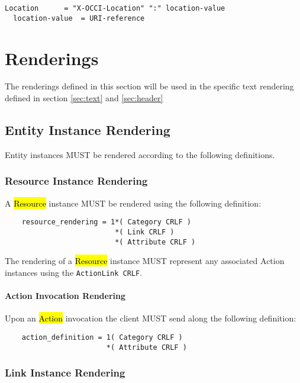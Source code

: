 \documentclass[10pt,a4paper]{article}
\begin{document}
\begin{verbatim}
Location      = "X-OCCI-Location" ":" location-value
  location-value  = URI-reference
\end{verbatim}

\section{Renderings}
\label{sec:renderings}

The renderings defined in this section will be used in the specific text rendering defined in section \ref{sec:text} and \ref{sec:header}

\subsection{Entity Instance Rendering}

Entity instances MUST be rendered according to the following definitions.

\subsubsection{Resource Instance Rendering}

A \hl{Resource} instance MUST be rendered using the following definition:

\begin{verbatim}
	resource_rendering = 1*( Category CRLF )
    	                  *( Link CRLF )
        	              *( Attribute CRLF )
\end{verbatim}

The rendering of a \hl{Resource} instance MUST represent any associated Action instances using the {\tt ActionLink CRLF}.

\paragraph{Action Invocation Rendering}

Upon an \hl{Action} invocation the client MUST send along the following definition:

\begin{verbatim}
	action_definition = 1( Category CRLF )
        	            *( Attribute CRLF )
\end{verbatim}

\subsubsection{Link Instance Rendering}
\end{document}
